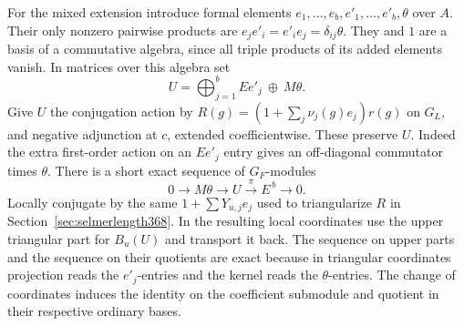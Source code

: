 \documentclass[a4paper,11pt]{article}
\theoremstyle{definition}
\theoremstyle{remark}
\numberwithin{equation}{section}
\begin{document}
For the mixed extension introduce formal elements
\(e_1,\ldots,e_b,e'_1,\ldots,e'_b,\theta\) over \(A\).
Their only nonzero pairwise products are
\(e_j e'_i=e'_i e_j=\delta_{ij}\theta\). They and \(1\)
are a basis of a commutative algebra, since all triple
products of its added elements vanish. In matrices over
this algebra set
\[
            U=\bigoplus_{j=1}^b E e'_j\ \oplus\ M\theta .
\]
Give \(U\) the conjugation action by
\(R(g)=(1+\sum_j\nu_j(g)e_j)r(g)\) on \(G_L\), and negative
adjunction at \(c\), extended coefficientwise. These preserve
\(U\). Indeed the extra first-order action on an \(E e'_j\)
entry gives an off-diagonal commutator times \(\theta\).
There is a short exact sequence of \(G_F\)-modules
\[
              0\longrightarrow M\theta\longrightarrow U
               \xrightarrow{\ \pi\ } E^{\,b}\longrightarrow0.
\]
Locally conjugate by the same \(1+\sum Y_{u,j}e_j\) used to
triangularize \(R\) in Section~\ref{sec:selmerlength368}.
In the resulting local coordinates use the upper triangular
part for \(B_u(U)\) and transport it back. The sequence
on upper parts and the sequence on their quotients are
exact because in triangular coordinates projection reads
the \(e'_j\)-entries and the kernel reads the \(\theta\)-entries.
The change of coordinates induces the identity on the
coefficient submodule and quotient in their respective
ordinary bases.
\end{document}
